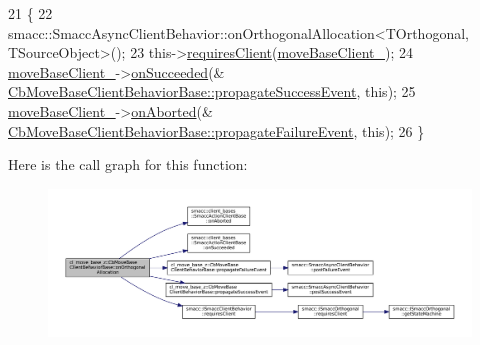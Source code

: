 \begin{DoxyCode}
21         \{
22             smacc::SmaccAsyncClientBehavior::onOrthogonalAllocation<TOrthogonal, TSourceObject>();
23             this->\hyperlink{classsmacc_1_1ISmaccClientBehavior_a32b16e99e3b4cb289414203dc861a440}{requiresClient}(\hyperlink{classcl__move__base__z_1_1CbMoveBaseClientBehaviorBase_ab2ef219464cfac8659b4a87c8d0db6d5}{moveBaseClient\_});
24             \hyperlink{classcl__move__base__z_1_1CbMoveBaseClientBehaviorBase_ab2ef219464cfac8659b4a87c8d0db6d5}{moveBaseClient\_}->\hyperlink{classsmacc_1_1client__bases_1_1SmaccActionClientBase_af6d77c27d21b2e4f621f53c5f1df088b}{onSucceeded}(&
      \hyperlink{classcl__move__base__z_1_1CbMoveBaseClientBehaviorBase_a12109fd9132a93140e4f022ee052e2ed}{CbMoveBaseClientBehaviorBase::propagateSuccessEvent}, \textcolor{keyword}{
      this});
25             \hyperlink{classcl__move__base__z_1_1CbMoveBaseClientBehaviorBase_ab2ef219464cfac8659b4a87c8d0db6d5}{moveBaseClient\_}->\hyperlink{classsmacc_1_1client__bases_1_1SmaccActionClientBase_a75c58162621a705bfd11efdf068eb06b}{onAborted}(&
      \hyperlink{classcl__move__base__z_1_1CbMoveBaseClientBehaviorBase_a8a1d14d98893dc21c4cb2b28c35e9b09}{CbMoveBaseClientBehaviorBase::propagateFailureEvent}, \textcolor{keyword}{
      this});
26         \}
\end{DoxyCode}
Here is the call graph for this function\+:
\nopagebreak
\begin{figure}[H]
\begin{center}
\leavevmode
\includegraphics[width=350pt]{classcl__move__base__z_1_1CbMoveBaseClientBehaviorBase_ae9e4d5856a88c367edd755cdd00b377f_cgraph}
\end{center}
\end{figure}
\mbox{\label{classcl__move__base__z_1_1CbMoveBaseClientBehaviorBase_a8a1d14d98893dc21c4cb2b28c35e9b09}} 
